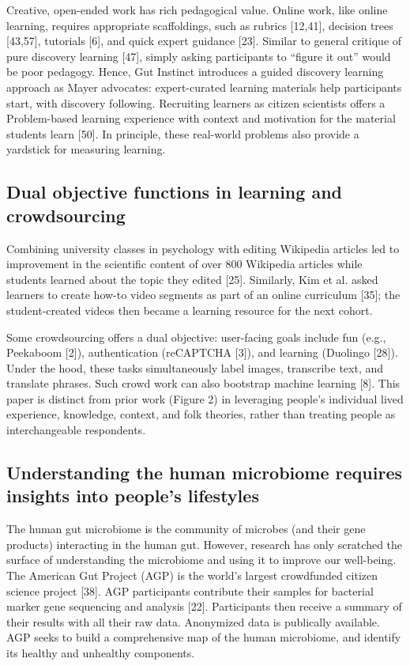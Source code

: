 Creative, open-ended work has rich pedagogical value. Online work, like online learning, requires appropriate scaffoldings, such as rubrics [12,41], decision trees [43,57], tutorials [6], and quick expert guidance [23]. Similar to general critique of pure discovery learning [47], simply asking participants to “figure it out” would be poor pedagogy. Hence, Gut Instinct introduces a guided discovery learning approach as Mayer advocates: expert-curated learning materials help participants start, with discovery following. Recruiting learners as citizen scientists offers a Problem-based learning experience with context and motivation for the material students learn [50]. In principle, these real-world problems also provide a yardstick for measuring learning. 

\subsection{Dual objective functions in learning and crowdsourcing}
Combining university classes in psychology with editing Wikipedia articles led to improvement in the scientific content of over 800 Wikipedia articles while students learned about the topic they edited [25]. Similarly, Kim et al. asked learners to create how-to video segments as part of an online curriculum [35]; the student-created videos then became a learning resource for the next cohort.

Some crowdsourcing offers a dual objective: user-facing goals include fun (e.g., Peekaboom [2]), authentication (reCAPTCHA [3]), and learning (Duolingo [28]). Under the hood, these tasks simultaneously label images, transcribe text, and translate phrases. Such crowd work can also bootstrap machine learning [8]. This paper is distinct from prior work (Figure 2) in leveraging people’s individual lived experience, knowledge, context, and folk theories, rather than treating people as interchangeable respondents.

\subsection{Understanding the human microbiome requires insights into people’s lifestyles}
The human gut microbiome is the community of microbes (and their gene products) interacting in the human gut. However, research has only scratched the surface of understanding the microbiome and using it to improve our well-being. The American Gut Project (AGP) is the world's largest crowdfunded citizen science project [38]. AGP participants contribute their samples for bacterial marker gene sequencing and analysis [22]. Participants then receive a summary of their results with all their raw data. Anonymized data is publically available. AGP seeks to build a comprehensive map of the human microbiome, and identify its healthy and unhealthy components.

